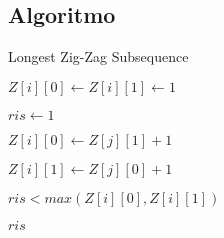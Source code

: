 \subsection{Algoritmo}
\begin{algorithm}[H]
	\caption{Longest Zig-Zag Subsequence}
	\begin{algorithmic}
			\State $Z[i][0] \gets Z[i][1] \gets 1 $
		\EndFor

		\State $ris \gets 1$

					\State $Z[i][0] \gets Z[j][1] + 1$
				\EndIf

					\State $Z[i][1] \gets Z[j][0] + 1$
				\EndIf
			\EndFor

				\State $ris < max(Z[i][0], Z[i][1])$
			\EndIf
		\EndFor

		\State \Return $ris$
		\EndFunction
	\end{algorithmic}
\end{algorithm}

